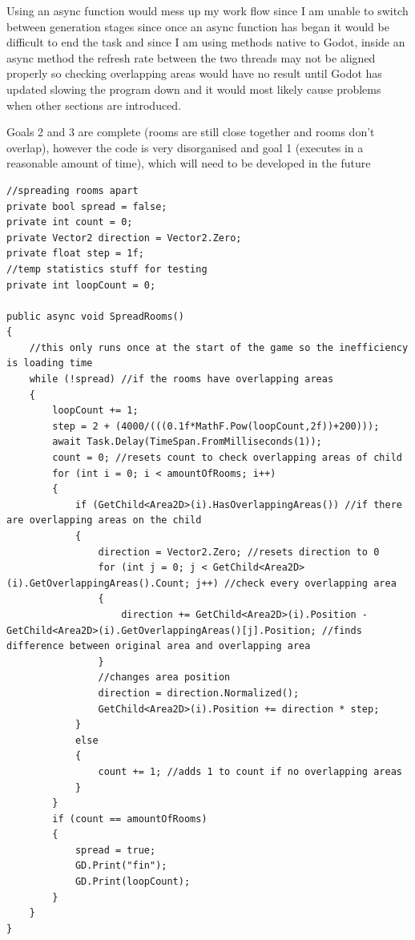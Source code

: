 \documentclass{article}
\newcommand{\parBr}{\vspace{5mm}}%
\begin{document}
Using an async function would mess up my work flow since I am unable to switch between generation stages since once an async function has began it would be difficult to end the task and since I am using methods native to Godot, inside an async method the refresh rate between the two threads may not be aligned properly so checking overlapping areas would have no result until Godot has updated slowing the program down and it would most likely cause problems when other sections are introduced.

\parBr

Goals 2 and 3 are complete (rooms are still close together and rooms don't overlap), however the code is very disorganised and goal 1 (executes in a reasonable amount of time), which will need to be developed in the future
\begin{lstlisting}
//spreading rooms apart
private bool spread = false;
private int count = 0;
private Vector2 direction = Vector2.Zero;
private float step = 1f;
//temp statistics stuff for testing
private int loopCount = 0;

public async void SpreadRooms()
{
    //this only runs once at the start of the game so the inefficiency is loading time
    while (!spread) //if the rooms have overlapping areas
    {
        loopCount += 1;
        step = 2 + (4000/(((0.1f*MathF.Pow(loopCount,2f))+200)));
        await Task.Delay(TimeSpan.FromMilliseconds(1));
        count = 0; //resets count to check overlapping areas of child
        for (int i = 0; i < amountOfRooms; i++)
        {
            if (GetChild<Area2D>(i).HasOverlappingAreas()) //if there are overlapping areas on the child
            {
                direction = Vector2.Zero; //resets direction to 0
                for (int j = 0; j < GetChild<Area2D>(i).GetOverlappingAreas().Count; j++) //check every overlapping area
                {
                    direction += GetChild<Area2D>(i).Position - GetChild<Area2D>(i).GetOverlappingAreas()[j].Position; //finds difference between original area and overlapping area
                }
                //changes area position
                direction = direction.Normalized();
                GetChild<Area2D>(i).Position += direction * step;
            }
            else
            {
                count += 1; //adds 1 to count if no overlapping areas
            }
        }
        if (count == amountOfRooms)
        {
            spread = true;
            GD.Print("fin");
            GD.Print(loopCount);
        }
    }
}
\end{lstlisting}
\end{document}
